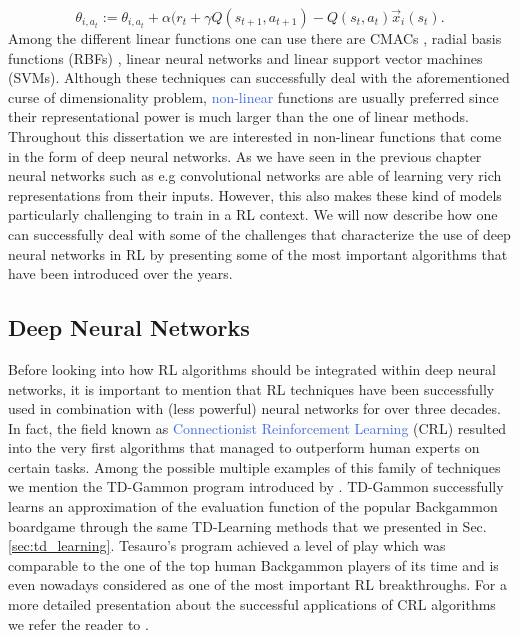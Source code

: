 \begin{equation}
	\theta_{i,a_t} := \theta_{i,a_t} + \alpha(r_t +\gamma Q(s_{t+1},a_{t+1}) - Q(s_t, a_t)\vec{x}_i(s_t).
\end{equation}
Among the different linear functions one can use there are CMACs \cite{lane1992theory}, radial basis functions (RBFs) \cite{park1993approximation}, linear neural networks \cite{mcculloch1943logical} and linear support vector machines (SVMs). Although these techniques can successfully deal with the aforementioned curse of dimensionality problem, \textcolor{RoyalBlue}{non-linear} functions are usually preferred since their representational power is much larger than the one of linear methods. Throughout this dissertation we are interested in non-linear functions that come in the form of deep neural networks. As we have seen in the previous chapter neural networks such as e.g convolutional networks are able of learning very rich representations from their inputs. However, this also makes these kind of models particularly challenging to train in a RL context. We will now describe how one can successfully deal with some of the challenges that characterize the use of deep neural networks in RL by presenting some of the most important algorithms that have been introduced over the years.    

\subsection{Deep Neural Networks}
Before looking into how RL algorithms should be integrated within deep neural networks, it is important to mention that RL techniques have been successfully used in combination with (less powerful) neural networks for over three decades. In fact, the field known as \textcolor{RoyalBlue}{Connectionist Reinforcement Learning} (CRL) resulted into the very first algorithms that managed to outperform human experts on certain tasks. Among the possible multiple examples of this family of techniques we mention the TD-Gammon program introduced by \citet{tesauro1994td}. TD-Gammon successfully learns an approximation of the evaluation function of the popular Backgammon boardgame through the same TD-Learning methods that we presented in Sec. \ref{sec:td_learning}. Tesauro's program achieved a level of play which was comparable to the one of the top human Backgammon players of its time and is even nowadays considered as one of the most important RL breakthroughs. For a more detailed presentation about the successful applications of CRL algorithms we refer the reader to \cite{bucsoniu2011approximate}.  

